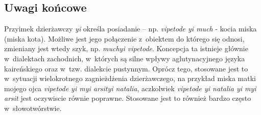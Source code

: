 \begin{spacing}{1.1}

\subsection{Uwagi końcowe}

Przyimek dzierżawczy \emph{yi} określa posiadanie -- np. \emph{vipetode yi much}
- kocia miska (miska kota). Możliwe jest jego połączenie z~obiektem do którego 
się odnosi, zmieniany jest wtedy szyk, np. \emph{muchyi vipetode}. Koncepcja ta 
istnieje głównie w~dialektach zachodnich, w~których są silne wpływy 
aglutynacyjnego języka kaireńskiego oraz w~tzw. dialekcie pustynnym. Oprócz 
tego, stosowane jest to w~sytuacji wielokrotnego zagnieżdżenia dzierżawczego, 
na przykład miska matki mojego ojca \emph{vipetode yi myi arsityi natalia}, 
aczkolwiek \emph{vipetode yi natalia yi myi arsit} jest oczywiscie równie 
poprawne. Stosowane jest to również bardzo często w~słowotwórstwie.

\end{spacing}